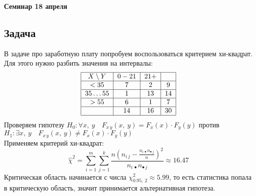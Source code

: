 \documentclass[12pt, a4paper]{article}
\begin{document}
\begin{center}
    \bf Семинар 18 апреля
\end{center}
\subsection*{Задача}
В задаче про заработную плату попробуем воспользоваться критерием хи-квадрат. Для этого нужно разбить значения на интервалы:
\[
\begin{tabular}{|c|c|c|c|}
    \hline
    $X \setminus Y$ & $0 - 21$ & $21+$ & \\
    \hline
    $< 35$ & 7 & 2 & 9 \\
    \hline
    $35\dots55$ & 1 & 13 & 14 \\
    \hline
    $> 55$ & 6 & 1 & 7 \\
    \hline
     & 14 & 16 & 30 \\
    \hline
\end{tabular}
\]
Проверяем гипотезу $H_0: \forall x,\ y\quad F_{x\, y}(x,\ y) = F_x(x)\cdot F_y(y)$ против $H_1: \exists x,\ y\quad F_{x\, y} (x,\ y) \neq F_x(x) \cdot F_y(y)$\\
Применяем критерий хи-квадрат:
\[\hat \chi^2 = \sum_{i = 1}^{m} \sum_{j = 1}^{k} \frac{n {\left( n_{i\, j} - \frac{n_{i\, \bullet} n_{\bullet\, j}}{n} \right)}^2}{n_{i\, \bullet} n_{\bullet\, j}} \approx 16.47\]
Критическая область начинается с числа $\chi^2_{0.95,\ 2} \approx 5.99$, то есть статистика попала в критическую область, значит принимается альтернативная гипотеза.
\end{document}
